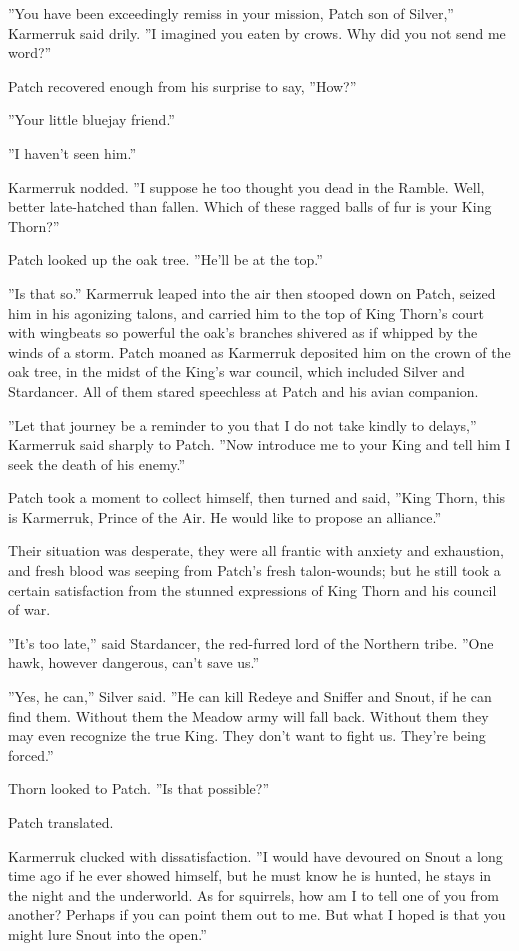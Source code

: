 \documentclass[12pt]{book}
\begin{document}
''You have been exceedingly remiss in your mission, Patch son of Silver,'' Karmerruk said drily. ''I imagined you eaten by crows. Why did you not send me word?''

Patch recovered enough from his surprise to say, ''How?''

''Your little bluejay friend.''

''I haven't seen him.''

Karmerruk nodded. ''I suppose he too thought you dead in the Ramble. Well, better late-hatched than fallen. Which of these ragged balls of fur is your King Thorn?''

Patch looked up the oak tree. ''He'll be at the top.''

''Is that so.'' Karmerruk leaped into the air %
then stooped down on Patch, seized him in his agonizing talons, and carried him to the top of King Thorn's court with wingbeats so powerful the oak's branches shivered as if whipped by the winds of a storm. Patch moaned as Karmerruk deposited him on the crown of the oak tree, in the midst of the King's war council, which included Silver and Stardancer. All of them stared speechless at Patch and his avian companion.

''Let that journey be a reminder to you that I do not take kindly to delays,'' Karmerruk said sharply to Patch. ''Now introduce me to your King and tell him I seek the death of his enemy.''

Patch took a moment to collect himself, then turned and said, ''King Thorn, this is Karmerruk, Prince of the Air. He would like to propose an alliance.''

Their situation was desperate, they were all frantic with anxiety and exhaustion, and fresh blood was seeping from Patch's fresh talon-wounds; but he still took a certain satisfaction from the stunned expressions of King Thorn and his council of war.

''It's too late,'' said Stardancer, the red-furred lord of the Northern tribe. ''One hawk, however dangerous, can't save us.''

''Yes, he can,'' Silver said. ''He can kill Redeye and Sniffer and Snout, if he can find them. Without them the Meadow army will fall back. Without them they may even recognize the true King. They don't want to fight us. They're being forced.''

Thorn looked to Patch. ''Is that possible?''

Patch translated.

Karmerruk clucked with dissatisfaction. ''I would have devoured on Snout a long time ago if he ever showed himself, but he must know he is hunted, he stays in the night and the underworld. As for squirrels, how am I to tell one of you from another? Perhaps if you can point them out to me. But what I hoped is that you might lure Snout into the open.''
\end{document}
